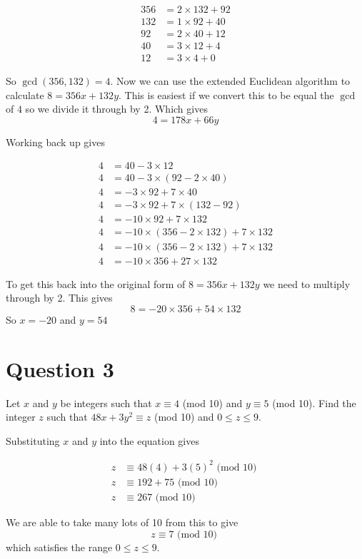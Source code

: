 \documentclass[11pt]{article}
\begin{document}
\begin{align*}
	356 &= 2 \times 132 + 92 \\
	132 &= 1 \times  92 + 40 \\
	 92 &= 2 \times  40 + 12 \\
	 40 &= 3 \times  12 +  4 \\
	 12 &= 3 \times   4 +  0
\end{align*}

So $\gcd(356,132) = 4$. Now we can use the extended Euclidean algorithm to
calculate $8 = 356x + 132y$. This is easiest if we convert this to be equal the
$\gcd$ of $4$ so we divide it through by 2. Which gives $$4 = 178x + 66y$$

Working back up gives

\begin{align*}
	4 &= 40 - 3 \times 12 \\
	4 &= 40 - 3 \times (92 - 2 \times 40) \\
	4 &= -3 \times 92 + 7 \times 40 \\
	4 &= -3 \times 92 + 7 \times (132 - 92) \\
	4 &= -10 \times 92 + 7 \times 132 \\
	4 &= -10 \times (356 - 2 \times 132) + 7 \times 132 \\
	4 &= -10 \times (356 - 2 \times 132) + 7 \times 132 \\
	4 &= -10 \times 356 + 27 \times 132
\end{align*}

To get this back into the original form of $8 = 356x + 132y$ we need to
multiply through by 2. This gives $$8 = -20 \times 356 + 54 \times 132$$
So $x = -20$ and $y = 54$


\section*{Question 3}
Let $x$ and $y$ be integers such that $x \equiv 4$ (mod 10) and $y \equiv 5$
(mod 10).  Find the integer $z$ such that $48x + 3y^2 \equiv z$ (mod 10) and $0
\leq z \leq 9$.

Substituting $x$ and $y$ into the equation gives 

\begin{align*}
	z &\equiv 48(4) + 3(5)^2 \text{ (mod 10) } \\
	z &\equiv 192 + 75 \text{ (mod 10) } \\
	z &\equiv 267 \text{ (mod 10) } 
\end{align*}

We are able to take many lots of 10 from this to give 
$$z \equiv 7 \text{ (mod 10) }$$ which satisfies the range 
$0 \leq z \leq 9$.
\end{document}
